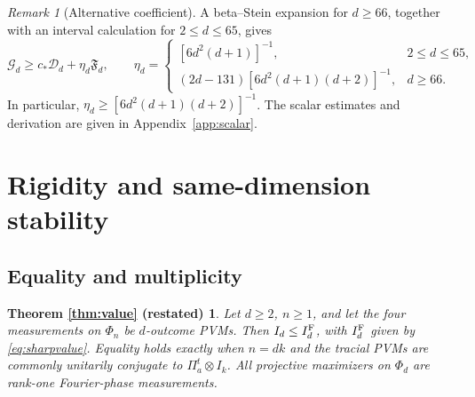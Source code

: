 \documentclass[11pt]{amsart}
\theoremstyle{remark}
\newtheorem{remark}[theorem]{Remark}
\theoremstyle{plain}
\newtheorem*{valueagain}{Theorem \ref{thm:value} (restated)}
\numberwithin{equation}{section}
\newcommand{\Fdef}{\mathfrak F_d}
\newcommand{\Gdef}{\mathcal G_d}
\newcommand{\Ddef}{\mathcal D_d}
\newcommand{\IF}{I_d^{\rm F}}
\newcommand{\cstar}{c_*}
\begin{document}
\begin{remark}[Alternative coefficient]\label{rem:alternative}
A beta--Stein expansion for \(d\ge66\), together with an interval
calculation for \(2\le d\le65\), gives
\begin{equation}\label{eq:piecewisecertificate}
 \Gdef\ge\cstar\Ddef+\eta_d\Fdef,\qquad
 \eta_d=
 \begin{cases}
 [6d^2(d+1)]^{-1},&2\le d\le65,\\
 (2d-131)[6d^2(d+1)(d+2)]^{-1},&d\ge66.
 \end{cases}
\end{equation}
In particular,
\(\eta_d\ge[6d^2(d+1)(d+2)]^{-1}\).
The scalar estimates and derivation are given in
Appendix~\ref{app:scalar}.
\end{remark}

\section{Rigidity and same-dimension stability}\label{sec:equality}

\subsection{Equality and multiplicity}

\begin{valueagain}
Let \(d\ge2\), \(n\ge1\), and let the four measurements on \(\Phi_n\)
be \(d\)-outcome PVMs. Then \(I_d\le\IF\), with \(\IF\) given by
\eqref{eq:sharpvalue}. Equality holds exactly when \(n=dk\) and the
tracial PVMs are commonly unitarily conjugate to
\(\Pi^t_a\otimes I_k\). All projective maximizers on \(\Phi_d\) are
rank-one Fourier-phase measurements.
\end{valueagain}
\end{document}
